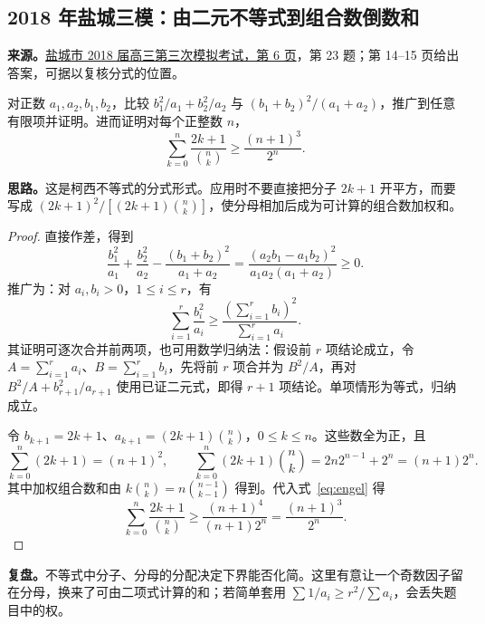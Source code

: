 \documentclass[UTF8]{ctexart}
\begin{document}
\subsection{2018 年盐城三模：由二元不等式到组合数倒数和}\label{sec:c2018yc3}
\textbf{来源。}\href{https://www.mianfeiwendang.com/doc/0bbc44eefbbd378979599972083302e88da33d09/6}{盐城市 2018 届高三第三次模拟考试，第 6 页}，第 23 题；第 14--15 页给出答案，可据以复核分式的位置。
\begin{example}[题意]
对正数 $a_1,a_2,b_1,b_2$，比较 $b_1^2/a_1+b_2^2/a_2$ 与 $(b_1+b_2)^2/(a_1+a_2)$，推广到任意有限项并证明。进而证明对每个正整数 $n$，
\[
\sum_{k=0}^{n}\frac{2k+1}{\binom nk}\geq\frac{(n+1)^3}{2^n}.
\]
\end{example}
\textbf{思路。}这是柯西不等式的分式形式。应用时不要直接把分子 $2k+1$ 开平方，而要写成 $(2k+1)^2/[(2k+1)\binom nk]$，使分母相加后成为可计算的组合数加权和。
\begin{proof}
直接作差，得到
\[
\frac{b_1^2}{a_1}+\frac{b_2^2}{a_2}
-\frac{(b_1+b_2)^2}{a_1+a_2}
=\frac{(a_2b_1-a_1b_2)^2}{a_1a_2(a_1+a_2)}\geq0.
\]
推广为：对 $a_i,b_i>0$，$1\leq i\leq r$，有
\begin{equation}\label{eq:engel}
\sum_{i=1}^{r}\frac{b_i^2}{a_i}\geq
\frac{(\sum_{i=1}^{r}b_i)^2}{\sum_{i=1}^{r}a_i}.
\end{equation}
其证明可逐次合并前两项，也可用数学归纳法：假设前 $r$ 项结论成立，令 $A=\sum_{i=1}^{r}a_i$、$B=\sum_{i=1}^{r}b_i$，先将前 $r$ 项合并为 $B^2/A$，再对 $B^2/A+b_{r+1}^2/a_{r+1}$ 使用已证二元式，即得 $r+1$ 项结论。单项情形为等式，归纳成立。

令 $b_{k+1}=2k+1$、$a_{k+1}=(2k+1)\binom nk$，$0\leq k\leq n$。这些数全为正，且
\[
\sum_{k=0}^{n}(2k+1)=(n+1)^2,
\qquad
\sum_{k=0}^{n}(2k+1)\binom nk
=2n2^{n-1}+2^n=(n+1)2^n.
\]
其中加权组合数和由 $k\binom nk=n\binom{n-1}{k-1}$ 得到。代入式~\eqref{eq:engel} 得
\[
\sum_{k=0}^{n}\frac{2k+1}{\binom nk}
\geq\frac{(n+1)^4}{(n+1)2^n}
=\frac{(n+1)^3}{2^n}.
\]
\end{proof}
\textbf{复盘。}不等式中分子、分母的分配决定下界能否化简。这里有意让一个奇数因子留在分母，换来了可由二项式计算的和；若简单套用 $\sum1/a_i\geq r^2/\sum a_i$，会丢失题目中的权。
\end{document}
